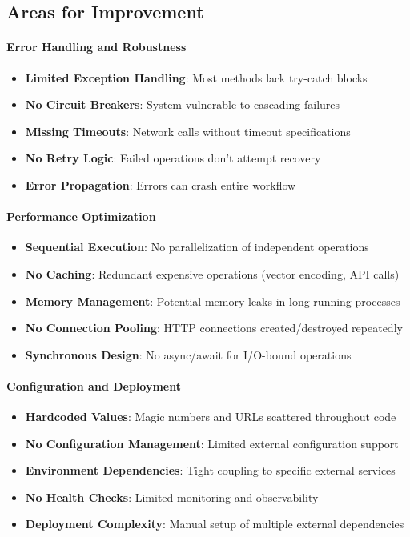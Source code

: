 \subsection{Areas for Improvement}

\paragraph{Error Handling and Robustness \starfull\starempty\starempty\starempty\starempty}
\begin{itemize}
\item \textbf{Limited Exception Handling}: Most methods lack try-catch blocks
\item \textbf{No Circuit Breakers}: System vulnerable to cascading failures
\item \textbf{Missing Timeouts}: Network calls without timeout specifications
\item \textbf{No Retry Logic}: Failed operations don't attempt recovery
\item \textbf{Error Propagation}: Errors can crash entire workflow
\end{itemize}

\paragraph{Performance Optimization \starfull\starempty\starempty\starempty\starempty}
\begin{itemize}
\item \textbf{Sequential Execution}: No parallelization of independent operations
\item \textbf{No Caching}: Redundant expensive operations (vector encoding, API calls)
\item \textbf{Memory Management}: Potential memory leaks in long-running processes
\item \textbf{No Connection Pooling}: HTTP connections created/destroyed repeatedly
\item \textbf{Synchronous Design}: No async/await for I/O-bound operations
\end{itemize}

\paragraph{Configuration and Deployment \starfull\starempty\starempty\starempty\starempty}
\begin{itemize}
\item \textbf{Hardcoded Values}: Magic numbers and URLs scattered throughout code
\item \textbf{No Configuration Management}: Limited external configuration support
\item \textbf{Environment Dependencies}: Tight coupling to specific external services
\item \textbf{No Health Checks}: Limited monitoring and observability
\item \textbf{Deployment Complexity}: Manual setup of multiple external dependencies
\end{itemize}

